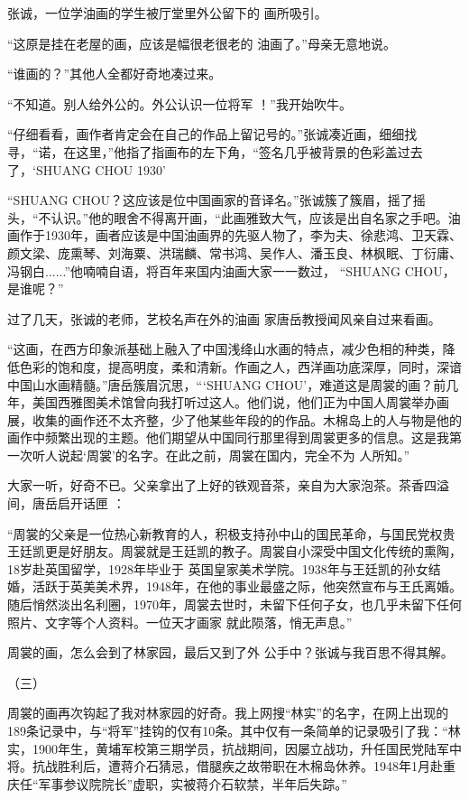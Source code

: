 \documentclass{article}
\begin{document}
张诚，一位学油画的学生被厅堂里外公留下的
画所吸引。 

“这原是挂在老屋的画，应该是幅很老很老的
油画了。”母亲无意地说。 


“谁画的？”其他人全都好奇地凑过来。 

\newpage

“不知道。别人给外公的。外公认识一位将军
！”我开始吹牛。 

“仔细看看，画作者肯定会在自己的作品上留记号的。”张诚凑近画，细细找寻，“诺，在这里，”他指了指画布的左下角，“签名几乎被背景的色彩盖过去了，‘SHUANG CHOU 1930’

“SHUANG CHOU？这应该是位中国画家的音译名。”张诚簇了簇眉，摇了摇头，“不认识。”他的眼舍不得离开画，“此画雅致大气，应该是出自名家之手吧。油画作于1930年，画者应该是中国油画界的先驱人物了，李为夫、徐悲鸿、卫天霖、颜文梁、庞熏琴、刘海粟、洪瑞麟、常书鸿、吴作人、潘玉良、林枫眠、丁衍庸、冯钢白......”他喃喃自语，将百年来国内油画大家一一数过，
“SHUANG CHOU，是谁呢？” 

过了几天，张诚的老师，艺校名声在外的油画
家唐岳教授闻风亲自过来看画。 

\newpage

“这画，在西方印象派基础上融入了中国浅绛山水画的特点，减少色相的种类，降低色彩的饱和度，提高明度，柔和清新。作画之人，西洋画功底深厚，同时，深谙中国山水画精髓。”唐岳簇眉沉思，“‘SHUANG CHOU’，难道这是周裳的画？前几年，美国西雅图美术馆曾向我打听过这人。他们说，他们正为中国人周裳举办画展，收集的画作还不太齐整，少了他某些年段的的作品。木棉岛上的人与物是他的画作中频繁出现的主题。他们期望从中国同行那里得到周裳更多的信息。这是我第一次听人说起‘周裳’的名字。在此之前，周裳在国内，完全不为
人所知。” 

大家一听，好奇不已。父亲拿出了上好的铁观音茶，亲自为大家泡茶。茶香四溢间，唐岳启开话匣
： 

“周裳的父亲是一位热心新教育的人，积极支持孙中山的国民革命，与国民党权贵王廷凯更是好朋友。周裳就是王廷凯的教子。周裳自小深受中国文化传统的熏陶，18岁赴英国留学，1928年毕业于
\newpage
英国皇家美术学院。1938年与王廷凯的孙女结婚，活跃于英美美术界，1948年，在他的事业最盛之际，他突然宣布与王氏离婚。随后悄然淡出名利圈，1970年，周裳去世时，未留下任何子女，也几乎未留下任何照片、文字等个人资料。一位天才画家
就此陨落，悄无声息。” 

周裳的画，怎么会到了林家园，最后又到了外
公手中？张诚与我百思不得其解。 


（三） 

周裳的画再次钩起了我对林家园的好奇。我上网搜“林实”的名字，在网上出现的189条记录中，与“将军”挂钩的仅有10条。其中仅有一条简单的记录吸引了我：“林实，1900年生，黄埔军校第三期学员，抗战期间，因屡立战功，升任国民党陆军中将。抗战胜利后，遭蒋介石猜忌，借腿疾之故带职在木棉岛休养。1948年1月赴重庆任“军事参议院院长”虚职，实被蒋介石软禁，半年后失踪。”
\end{document}
